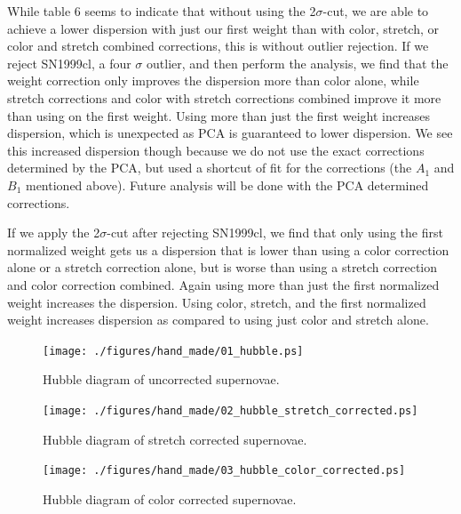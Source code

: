 While table 6 seems to indicate that without using the 2$\sigma$-cut, we are able to achieve a lower dispersion with just our first weight than with color, stretch, or color and stretch combined corrections, this is without outlier rejection. If we reject SN1999cl, a four $\sigma$ outlier, and then perform the analysis, we find that the weight correction only improves the dispersion more than color alone, while stretch corrections and color with stretch corrections combined improve it more than using on the first weight. Using more than just the first weight increases dispersion, which is unexpected as PCA is guaranteed to lower dispersion. We see this increased dispersion though because we do not use the exact corrections determined by the PCA, but used a shortcut of fit for the corrections (the $A_{1}$ and $B_{1}$ mentioned above). Future analysis will be done with the PCA determined corrections.

If we apply the 2$\sigma$-cut after rejecting SN1999cl, we find that only using the first normalized weight gets us a dispersion that is lower than using a color correction alone or a stretch correction alone, but is worse than using a stretch correction and color correction combined. Again using more than just the first normalized weight increases the dispersion. Using color, stretch, and the first normalized weight increases dispersion as compared to using just color and stretch alone.



\clearpage

\begin{figure}[ht]
\begin{center}
\texttt{[image: ./figures/hand\_made/01\_hubble.ps]}
\end{center}
\caption{
Hubble diagram of uncorrected supernovae.
}
\label{fig:hduncor}
\end{figure}
\clearpage

\begin{figure}[ht]
\begin{center}
\texttt{[image: ./figures/hand\_made/02\_hubble\_stretch\_corrected.ps]}
\end{center}
\caption{
Hubble diagram of stretch corrected supernovae.
}
\label{fig:hds}
\end{figure}
\clearpage

\begin{figure}[ht]
\begin{center}
\texttt{[image: ./figures/hand\_made/03\_hubble\_color\_corrected.ps]}
\end{center}
\caption{
Hubble diagram of color corrected supernovae.
}
\label{fig:hdc}
\end{figure}
\clearpage

